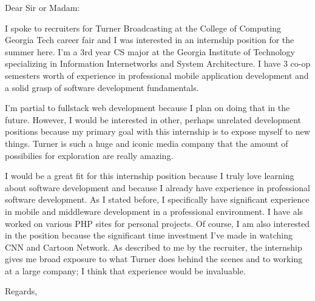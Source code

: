 \documentclass{letter}
\begin{document}
\begin{letter}{}
\opening{Dear Sir or Madam:}

I spoke to recruiters for Turner Broadcasting at the College of Computing Georgia Tech career fair and I was interested in an internship position for the summer here. I'm a 3rd year CS major at the Georgia Institute of Technology specializing in Information Internetworks and System Architecture. I have 3 co-op semesters worth of experience in professional mobile application development and a solid grasp of software development fundamentals. 

I'm partial to fullstack web development because I plan on doing that in the future. However, I would be interested in other, perhaps unrelated development positions because my primary goal with this internship is to expose myself to new things. Turner is such a huge and iconic media company that the amount of possibilies for exploration are really amazing.

I would be a great fit for this internship position because I truly love learning about software development and because I already have experience in professional software development.  As I stated before, I specifically have significant experience in mobile and middleware development in a professional environment. I have als worked on various PHP sites for personal projects. Of course, I am also interested in the position because the significant time investment I've made in watching CNN and Cartoon Network. As described to me by the recruiter, the internship gives me broad exposure to what Turner does behind the scenes and to working at a large company; I think that experience would be invaluable.


\closing{Regards,}
\end{letter}
\end{document}
